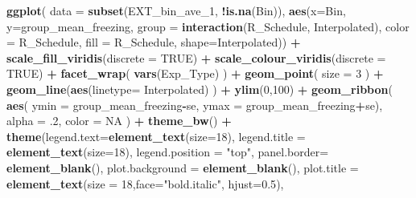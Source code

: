 \documentclass[
]{article}
\newenvironment{Shaded}{\begin{snugshade}}{\end{snugshade}}
\newcommand{\AttributeTok}[1]{\textcolor[rgb]{0.13,0.29,0.53}{#1}}
\newcommand{\ConstantTok}[1]{\textcolor[rgb]{0.56,0.35,0.01}{#1}}
\newcommand{\DecValTok}[1]{\textcolor[rgb]{0.00,0.00,0.81}{#1}}
\newcommand{\FloatTok}[1]{\textcolor[rgb]{0.00,0.00,0.81}{#1}}
\newcommand{\FunctionTok}[1]{\textcolor[rgb]{0.13,0.29,0.53}{\textbf{#1}}}
\newcommand{\NormalTok}[1]{#1}
\newcommand{\SpecialCharTok}[1]{\textcolor[rgb]{0.81,0.36,0.00}{\textbf{#1}}}
\newcommand{\StringTok}[1]{\textcolor[rgb]{0.31,0.60,0.02}{#1}}
\begin{document}
\begin{Shaded}
\begin{Highlighting}[]
\FunctionTok{ggplot}\NormalTok{(}
  \AttributeTok{data =} \FunctionTok{subset}\NormalTok{(EXT\_bin\_ave\_1, }\SpecialCharTok{!}\FunctionTok{is.na}\NormalTok{(Bin)),}
  \FunctionTok{aes}\NormalTok{(}\AttributeTok{x=}\NormalTok{Bin,}
      \AttributeTok{y=}\NormalTok{group\_mean\_freezing,}
      \AttributeTok{group =} \FunctionTok{interaction}\NormalTok{(R\_Schedule, Interpolated),}
      \AttributeTok{color =}\NormalTok{ R\_Schedule,}
      \AttributeTok{fill =}\NormalTok{ R\_Schedule,}
      \AttributeTok{shape=}\NormalTok{Interpolated)) }\SpecialCharTok{+}
  \FunctionTok{scale\_fill\_viridis}\NormalTok{(}\AttributeTok{discrete =} \ConstantTok{TRUE}\NormalTok{) }\SpecialCharTok{+}
  \FunctionTok{scale\_colour\_viridis}\NormalTok{(}\AttributeTok{discrete =} \ConstantTok{TRUE}\NormalTok{) }\SpecialCharTok{+}
  \FunctionTok{facet\_wrap}\NormalTok{(}
    \FunctionTok{vars}\NormalTok{(Exp\_Type)}
\NormalTok{  ) }\SpecialCharTok{+}
  \FunctionTok{geom\_point}\NormalTok{(}
    \AttributeTok{size =} \DecValTok{3}
\NormalTok{  ) }\SpecialCharTok{+}
  \FunctionTok{geom\_line}\NormalTok{(}\FunctionTok{aes}\NormalTok{(}\AttributeTok{linetype=}\NormalTok{ Interpolated)}
\NormalTok{  ) }\SpecialCharTok{+} 
  \FunctionTok{ylim}\NormalTok{(}\DecValTok{0}\NormalTok{,}\DecValTok{100}\NormalTok{) }\SpecialCharTok{+}
  \FunctionTok{geom\_ribbon}\NormalTok{(}
    \FunctionTok{aes}\NormalTok{(}
      \AttributeTok{ymin =}\NormalTok{ group\_mean\_freezing}\SpecialCharTok{{-}}\NormalTok{se,}
      \AttributeTok{ymax =}\NormalTok{ group\_mean\_freezing}\SpecialCharTok{+}\NormalTok{se),}
    \AttributeTok{alpha =}\NormalTok{ .}\DecValTok{2}\NormalTok{,}
    \AttributeTok{color =} \ConstantTok{NA}
\NormalTok{  ) }\SpecialCharTok{+}
  \FunctionTok{theme\_bw}\NormalTok{() }\SpecialCharTok{+}
  \FunctionTok{theme}\NormalTok{(}\AttributeTok{legend.text=}\FunctionTok{element\_text}\NormalTok{(}\AttributeTok{size=}\DecValTok{18}\NormalTok{),}
        \AttributeTok{legend.title =} \FunctionTok{element\_text}\NormalTok{(}\AttributeTok{size=}\DecValTok{18}\NormalTok{),}
        \AttributeTok{legend.position =} \StringTok{"top"}\NormalTok{,}
        \AttributeTok{panel.border=} \FunctionTok{element\_blank}\NormalTok{(),}
        \AttributeTok{plot.background =} \FunctionTok{element\_blank}\NormalTok{(),}
        \AttributeTok{plot.title =} \FunctionTok{element\_text}\NormalTok{(}\AttributeTok{size =} \DecValTok{18}\NormalTok{,}\AttributeTok{face=}\StringTok{"bold.italic"}\NormalTok{, }\AttributeTok{hjust=}\FloatTok{0.5}\NormalTok{),}

\end{Highlighting}
\end{Shaded}
\end{document}
